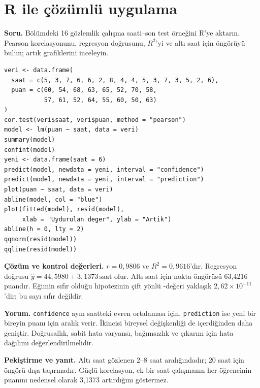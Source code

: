 \section{R ile çözümlü uygulama}
\label{sec:r-b13}

\textbf{Soru.} Bölümdeki 16 gözlemlik çalışma saati--son test örneğini
R'ye aktarın. Pearson korelasyonunu, regresyon doğrusunu, $R^2$'yi ve altı
saat için öngörüyü bulun; artık grafiklerini inceleyin.

\begin{lstlisting}[style=prismR]
veri <- data.frame(
  saat = c(5, 3, 7, 6, 6, 2, 8, 4, 4, 5, 3, 7, 3, 5, 2, 6),
  puan = c(60, 54, 68, 63, 65, 52, 70, 58,
           57, 61, 52, 64, 55, 60, 50, 63)
)
cor.test(veri$saat, veri$puan, method = "pearson")
model <- lm(puan ~ saat, data = veri)
summary(model)
confint(model)
yeni <- data.frame(saat = 6)
predict(model, newdata = yeni, interval = "confidence")
predict(model, newdata = yeni, interval = "prediction")
plot(puan ~ saat, data = veri)
abline(model, col = "blue")
plot(fitted(model), resid(model),
     xlab = "Uydurulan deger", ylab = "Artik")
abline(h = 0, lty = 2)
qqnorm(resid(model))
qqline(resid(model))
\end{lstlisting}

\begin{outputguidebox}
\textbf{Çözüm ve kontrol değerleri.} $r=0{,}9806$ ve
$R^2=0{,}9616$'dır. Regresyon doğrusu
$\hat y=44{,}5980+3{,}1373\,\text{saat}$ olur. Altı saat için nokta
öngörüsü 63,4216 puandır. Eğimin sıfır olduğu hipotezinin çift yönlü
\pval-değeri yaklaşık $2{,}62\times10^{-11}$'dir; bu sayı sıfır değildir.
\end{outputguidebox}

\textbf{Yorum.} \texttt{confidence} aynı saatteki evren ortalaması için,
\texttt{prediction} ise yeni bir bireyin puanı için aralık verir. İkincisi
bireysel değişkenliği de içerdiğinden daha geniştir. Doğrusallık, sabit hata
varyansı, bağımsızlık ve çıkarım için hata dağılımı değerlendirilmelidir.

\textbf{Pekiştirme ve yanıt.} Altı saat gözlenen 2--8 saat aralığındadır;
20 saat için öngörü dışa taşırmadır. Güçlü korelasyon, ek bir saat çalışmanın
her öğrencinin puanını nedensel olarak 3,1373 artırdığını göstermez.